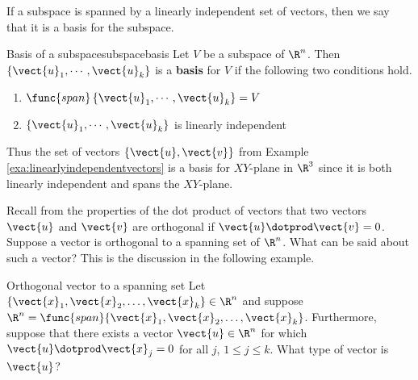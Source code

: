 If a subspace is spanned by a linearly independent set of vectors,
then we say that it is a basis for the subspace.

\begin{definition}{Basis of a subspace}{subspacebasis}
Let $V$ be a subspace of $\R^{n}$. Then $\left\{
\vect{u}_{1},\cdots ,\vect{u}_{k}\right\} $ is a \textbf{basis} for
$V$ if the following two conditions
hold.

\begin{enumerate}
\item $\func{span}\left\{ \vect{u}_{1},\cdots ,\vect{u}_{k}\right\} =V$
\item $\left\{ \vect{u}_{1},\cdots ,\vect{u}_{k}\right\} $ is linearly
independent
\end{enumerate}
\end{definition}

Thus the set of vectors $\{\vect{u}, \vect{v}\}$ from Example
\ref{exa:linearlyindependentvectors} is a basis for $XY$-plane in
$\R^{3}$ since it is both linearly independent and spans
the $XY$-plane.

 Recall from the properties of the dot product of vectors 
that two vectors $\vect{u}$ and $\vect{v}$ are orthogonal if $\vect{u}
\dotprod \vect{v} = 0$. Suppose a vector is orthogonal to a spanning set of $\R^n$. What can be said about such a vector? This is the discussion in the following example.

\begin{example}{Orthogonal vector to a spanning set}{}
Let $\{\vect{x}_1, \vect{x}_2, \ldots, \vect{x}_k\}\in\R^n$ and
suppose $\R^n=\func{span}\{\vect{x}_1, \vect{x}_2, \ldots, \vect{x}_k\}$.
Furthermore, suppose that there exists a vector $\vect{u}\in\R^n$ for which $\vect{u}\dotprod \vect{x}_j=0$ for all $j$, $1\leq j\leq k$.
What type of vector is $\vect{u}$?
\end{example}

